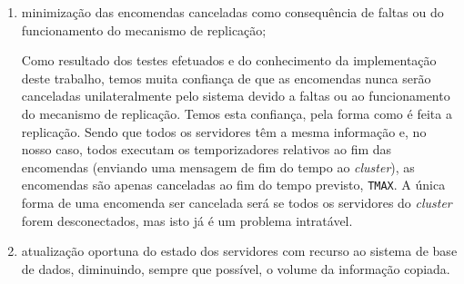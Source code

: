 \documentclass[a4paper]{report}
\begin{document}
{\begin{enumerate}
		Foram feitos testes com apenas um servidor, de forma a perceber os limites do sistema.
		Para pedidos de \texttt{Update}, o servidor estabilizou na resposta a cerca de 4000 pedidos por segundo.
		Para pedidos de \texttt{Get}, o servidor estabilizou na resposta a cerca de 9000 pedidos por segundo.

		Pelo grande objetivo deste trabalho ser a resiliência a faltas, faz sentido testar o sistema com mais do que um servidor. Por isso, foram feitos testes para um \textit{cluster} de 3 servidores.
		Para pedidos de \texttt{Update}, o cluster estabilizou em cerca de 3300 pedidos por segundo.
		A quebra em relação aos testes com apenas um servidor pode ser explicada pelo facto de ser necessária a comunicação entre servidores.
		Para pedidos de \texttt{Get}, a intuição é a de que, como este tipo de pedidos não implica a comunicação entre servidores, o limite de pedidos deve ser individual a cada servidor, pelo que neste caso, o limite deverão ser 27000 pedidos por segundo (9000 $\times$ 3).

		A limitação de 4 processos disponíveis não permitiu o teste a um \textit{cluster} com 5 servidores, uma vez que a necessidade de partilhar \textit{CPU} entre os mesmos terá impacto (significativo) na performance individual de cada servidor e coletiva do sistema.
		Apesar disto, a expectativa é que um \textit{cluster} com mais servidores não apresentará quebras muito significativas quando comparado com um de 3 servidores.
		
		\item minimização das encomendas canceladas como consequência de faltas ou do funcionamento do mecanismo de replicação;
		
		Como resultado dos testes efetuados e do conhecimento da implementação deste trabalho, temos muita confiança de que as encomendas nunca serão canceladas unilateralmente pelo sistema devido a faltas ou ao funcionamento do mecanismo de replicação. Temos esta confiança, pela forma como é feita a replicação. Sendo que todos os servidores têm a mesma informação e, no nosso caso, todos executam os temporizadores relativos ao fim das encomendas (enviando uma mensagem de fim do tempo ao \textit{cluster}), as encomendas são apenas canceladas ao fim do tempo previsto, \texttt{TMAX}. A única forma de uma encomenda ser cancelada será se todos os servidores do \textit{cluster} forem desconectados, mas isto já é um problema intratável.
		
		\item atualização oportuna do estado dos servidores com recurso ao sistema de base de dados, diminuindo, sempre que possível, o volume da informação copiada.
		

\end{enumerate}}
\end{document}
